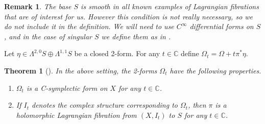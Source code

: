 \documentclass[10pt]{amsart}
\newcommand{\bbC}{\mathbb{C}}
\newtheorem{thm}[defn]{Theorem}
\newtheorem{rem}[defn]{Remark}
\begin{document}
\begin{rem} The base $S$ is smooth in all known examples of Lagrangian fibrations that are of
interest for us. However this condition is not
really necessary, so we do not include it in the definition.
We will need to use $C^\infty$ differential forms on $S$, and in the case of singular $S$
we define them as in \cite{Va}.
\end{rem}

Let $\eta\in \Lambda^{2,0}S\oplus \Lambda^{1,1}S$ be a closed 2-form.
For any $t\in \bbC$ define $\Omega_t = \Omega + t\pi^*\eta$.

\begin{thm}[\cite{BDV}]
In the above setting, the 2-forms $\Omega_t$ have the following properties.
\begin{enumerate}
\item $\Omega_t$ is a C-symplectic form on $X$ for any $t\in \bbC$.
\item If $I_t$ denotes the complex structure corresponding to $\Omega_t$,
then $\pi$ is a holomorphic Lagrangian fibration from $(X,I_t)$ to $S$ for any $t\in \bbC$.
\end{enumerate}
\end{thm}
\end{document}
